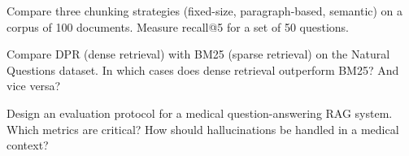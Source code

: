 \begin{exercise}
Compare three chunking strategies (fixed-size, paragraph-based, semantic)
on a corpus of 100 documents. Measure recall@5 for a set of 50 questions.
\end{exercise}

\begin{exercise}[DPR vs BM25]
Compare DPR (dense retrieval) with BM25 (sparse retrieval) on the
Natural Questions dataset. In which cases does dense retrieval outperform
BM25? And vice versa?
\end{exercise}

\begin{exercise}
Design an evaluation protocol for a medical question-answering RAG
system. Which metrics are critical? How should hallucinations be handled
in a medical context?
\end{exercise}
